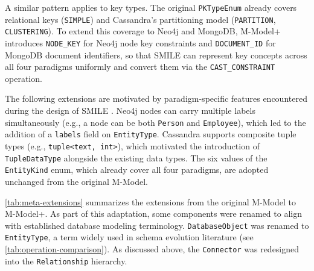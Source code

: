   A similar pattern applies to key types. The original \texttt{PKTypeEnum} already covers relational keys (\texttt{SIMPLE}) and Cassandra's
  partitioning model (\texttt{PARTITION}, \texttt{CLUSTERING}). To extend this coverage to Neo4j and MongoDB, M-Model+ introduces \texttt{NODE\_KEY}
   for Neo4j node key constraints and \texttt{DOCUMENT\_ID} for MongoDB document identifiers, so that SMILE  can represent key concepts across all
  four paradigms uniformly and convert them via the \texttt{CAST\_CONSTRAINT} operation.

  The following extensions are motivated by paradigm-specific features encountered during the design of SMILE . Neo4j nodes can carry multiple labels
  simultaneously (e.g., a node can be both \texttt{Person} and \texttt{Employee}), which led to the addition of a \texttt{labels} field on
  \texttt{EntityType}. Cassandra supports composite tuple types (e.g., \texttt{tuple<text, int>}), which motivated the introduction of
  \texttt{TupleDataType} alongside the existing data types. The six values of the \texttt{EntityKind} enum, which already cover all four paradigms,
  are adopted unchanged from the original M-Model.

\autoref{tab:meta-extensions} summarizes the extensions from the original M-Model to M-Model+. As part of this adaptation, some components were
  renamed to align with established database modeling terminology. \texttt{DatabaseObject} was renamed to \texttt{EntityType}, a term widely used in schema evolution literature (see \autoref{tab:operation-comparison}). As discussed above, the \texttt{Connector} was redesigned into the \texttt{Relationship} hierarchy.

